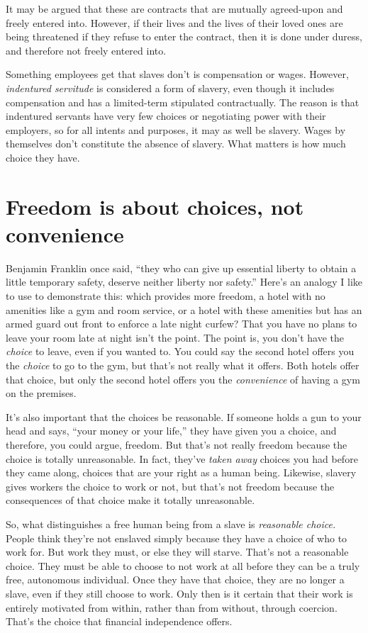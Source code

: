 It may be argued that these are contracts that are mutually agreed-upon and freely entered into. However, if their lives and the lives of their loved ones are being threatened if they refuse to enter the contract, then it is done under duress, and therefore not freely entered into.

Something employees get that slaves don't is compensation or wages. However, \emph{indentured servitude} is considered a form of slavery, even though it includes compensation and has a limited-term stipulated contractually. The reason is that indentured servants have very few choices or negotiating power with their employers, so for all intents and purposes, it may as well be slavery. Wages by themselves don't constitute the absence of slavery. What matters is how much choice they have.

\section{Freedom is about choices, not convenience}
Benjamin Franklin once said, ``they who can give up essential liberty to obtain a little temporary safety, deserve neither liberty nor safety.'' Here's an analogy I like to use to demonstrate this: which provides more freedom, a hotel with no amenities like a gym and room service, or a hotel with these amenities but has an armed guard out front to enforce a late night curfew? That you have no plans to leave your room late at night isn't the point. The point is, you don't have the \emph{choice} to leave, even if you wanted to. You could say the second hotel offers you the \emph{choice} to go to the gym, but that's not really what it offers. Both hotels offer that choice, but only the second hotel offers you the \emph{convenience} of having a gym on the premises.

It's also important that the choices be reasonable. If someone holds a gun to your head and says, ``your money or your life,'' they have given you a choice, and therefore, you could argue, freedom. But that's not really freedom because the choice is totally unreasonable. In fact, they've \emph{taken away} choices you had before they came along, choices that are your right as a human being. Likewise, slavery gives workers the choice to work or not, but that's not freedom because the consequences of that choice make it totally unreasonable.

So, what distinguishes a free human being from a slave is \emph{reasonable choice.} People think they're not enslaved simply because they have a choice of who to work for. But work they must, or else they will starve. That's not a reasonable choice. They must be able to choose to not work at all before they can be a truly free, autonomous individual. Once they have that choice, they are no longer a slave, even if they still choose to work. Only then is it certain that their work is entirely motivated from within, rather than from without, through coercion. That's the choice that financial independence offers.

